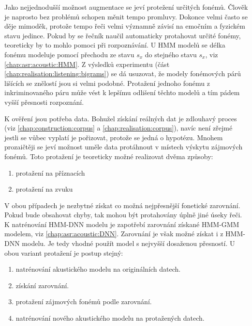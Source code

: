 Jako nejjednodušší možnost augmentace se jeví protežení určitých fonémů. Člověk je naprosto bez problémů schopen měnit tempo promluvy. Dokonce velmi často se děje mimoděk, protože tempo řeči velmi významně závisí na emočním a fyzickém stavu jedince. Pokud by se řečník naučil automaticky protahovat určité fonémy, teoreticky by to mohlo pomoci při rozpoznávání. U HMM modelů se délka fonému modeluje pomocí přechodu ze stavu $s_x$ do stejného stavu $s_x$, viz \ref{chap:asr:acoustic:HMM}. Z výsledků  experimentu (část \ref{chap:realisation:listening:bigrams}) se dá usuzovat, že modely fonémových párů lišících se znělostí jsou si velmi podobné. Protažení jednoho fonému z inkriminovaného páru může vést k lepšímu odlišení těchto modelů
a tím pádem vyšší přesnosti rozpoznání.

K ověření jsou potřeba data. Bohužel získání reálných dat je zdlouhavý proces (viz \ref{chap:construction:corpus} a \ref{chap:realisation:corpus}), navíc není zřejmé jestli se vůbec vyplatí je pořizovat, protože se jedná o hypotézu. Mnohem prozaičtěji se jeví možnost uměle data protáhnout v místech výskytu zájmových fonémů. Toto protažení je teoreticky možné realizovat dvěma způsoby:

\begin{enumerate}
  \item protažení na příznacích
  \item protažení na zvuku
\end{enumerate}

\noindent V obou případech je nezbytné získat co možná nejpřesnější fonetické zarovnání. Pokud bude obsahovat chyby, tak mohou být protahovány úplně jiné úseky řeči. K natrénování HMM-DNN modelu je zapotřebí zarovnání získané HMM-GMM modelem, viz \ref{chap:asr:acoustic:DNN}. Zarovnání je však možné získat i z HMM-DNN modelu. Je tedy vhodné použít model s nejvyšší dosaženou přesností. U obou variant protažení je postup stejný:

\begin{enumerate}
  \item natrénování akustického modelu na originálních datech.
  \item získání zarovnání.
  \item protažení zájmových fonémů podle zarovnání.
  \item natrénování nového akustického modelu na protažených datech.
\end{enumerate}

